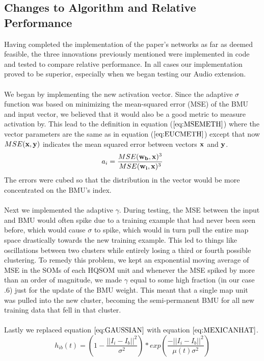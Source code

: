 \documentclass[a4paper,10pt]{article}
\begin{document}
\subsection{Changes to Algorithm and Relative Performance}
Having completed the implementation of the paper's networks as far as deemed feasible, the three
innovations previously mentioned were implemented in code and tested to compare relative
performance. In all cases our implementation proved to be superior, especially when we began
testing our Audio extension.
\\
\\
We began by implementing the new activation vector.  Since the adaptive $\sigma$ function was based
on minimizing the mean-squared error (MSE) of the BMU and input vector, we believed that it would
also be a good metric to measure activation by.  This lead to the definition in equation
($\ref{eq:MSEMETH}$) where the vector parameters are the same as in equation ($\ref{eq:EUCMETH}$)
except that now $MSE(\bold{x},\bold{y})$ indicates the mean squared error between vectors
$\bold{x}$ and $\bold{y}$.
\begin{equation} \label{eq:MSEMETH}
 a_i = \frac{MSE(\bold{w_b}, \bold{x})^3}{MSE(\bold{w_i},\bold{x})^3}
\end{equation}
The errors were cubed so that the distribution in the vector would be more concentrated on the
BMU's index.
\\
\\
Next we implemented the adaptive $\gamma$.  During testing, the MSE between the input and BMU would
often spike due to a training example that had never been seen before, which would cause $\sigma$ to
spike, which would in turn pull the entire map space drastically towards the new training example. 
This led to things like oscillations between two clusters while entirely losing a third or fourth
possible clustering.  To remedy this problem, we kept an exponential moving average of MSE in the
SOMs of each HQSOM unit and whenever the MSE spiked by more than an order of magnitude, we made
$\gamma$ equal to some high fraction (in our case .6) just for the update of the BMU weight.  This
meant that a single map unit was pulled into the new cluster, becoming the semi-permanent BMU for
all new training data that fell in that cluster.
\\
\\
Lastly we replaced equation $\ref{eq:GAUSSIAN}$ with equation $\ref{eq:MEXICANHAT}$.
\begin{equation}\label{eq:MEXICANHAT}
 h_{ib}(t) = (1-\frac{||I_i-I_b||^2}{\sigma^2})*exp(\frac{-||I_i-I_b||^2}{\mu(t)\sigma^2})
\end{equation}
\end{document}
